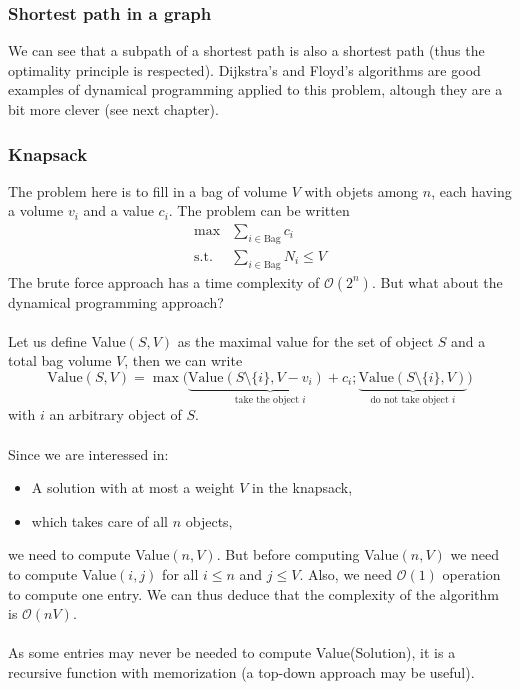 \subsubsection{Shortest path in a graph}

We can see that a subpath of a shortest path is also a shortest path (thus the optimality principle is respected). Dijkstra's and Floyd's algorithms are good examples of dynamical programming applied to this problem, altough they are a bit more clever (see next chapter).

\subsubsection{Knapsack}

The problem here is to fill in a bag of volume $V$ with objets among $n$, each having a volume $v_i$ and a value $c_i$. The problem can be written
\begin{align*}
\max & \sum_{i \in \text{Bag}} c_i  \\
\text{s.t.} & \sum_{i \in \text{Bag}} N_i \leq V
\end{align*}
The brute force approach has a time complexity of $\mathcal{O}(2^n)$. But what about the dynamical programming approach?
\\ \\
Let us define Value$(S,V)$ as the maximal value for the set of object $S$ and a total bag volume $V$, then we can write
\[
\text{Value}(S,V) = \max \big(\underbrace{\text{Value}(S \setminus \{i\}, V-v_i)+c_i}_{\text{take the object }i} ; \underbrace{\text{Value}(S \setminus \{i\},V)}_{\text{do not take object }i}\big)
\]
with $i$ an arbitrary object of $S$.
\\ \\
Since we are interessed in:
\begin{itemize}
\item A solution with at most a weight $V$ in the knapsack,
\item which takes care of all $n$ objects,
\end{itemize}
we need to compute Value$(n,V)$. But before computing Value$(n,V)$ we need to compute Value$(i,j)$ for all $i \leq n$ and $j \leq V$. Also, we need $\mathcal{O}(1)$ operation to compute one entry. We can thus deduce that the complexity of the algorithm is $\mathcal{O}(nV)$.
\\ \\
As some entries may never be needed to compute Value(Solution), it is a recursive function with memorization (a top-down approach may be useful).

